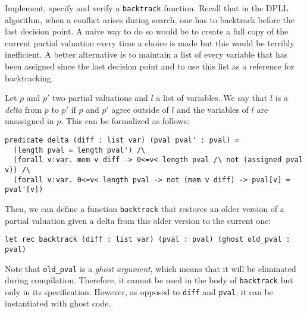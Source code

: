 \documentclass[11pt]{article}
\begin{document}
\begin{task}[5 pts] Implement, specify and verify a \texttt{backtrack} function. Recall that in the DPLL algorithm, when a conflict arises during search, one has to
backtrack before the last decision point. A naive way to do so would be to create a
full copy of the current partial valuation every time a choice is made but this
would be terribly inefficient. A better alternative is to maintain a list of every
variable that has been assigned since the last decision point and to use this list as a reference for backtracking.

Let $p$ and $p'$ two partial valuations and $l$ a list of variables. We say that
$l$ is a \emph{delta} from $p$ to $p'$ if $p$ and $p'$ agree outside of $l$ and
the variables of $l$ are unassigned in $p$. This can be formalized as follows:

\begin{lstlisting}
predicate delta (diff : list var) (pval pval' : pval) =
  (length pval = length pval') /\
  (forall v:var. mem v diff -> 0<=v< length pval /\ not (assigned pval v)) /\
  (forall v:var. 0<=v< length pval -> not (mem v diff) -> pval[v] = pval'[v])
\end{lstlisting}

Then, we can define a function \verb|backtrack| that restores an older version
of a partial valuation given a delta from this older version to the current one:

\begin{lstlisting}
let rec backtrack (diff : list var) (pval : pval) (ghost old_pval : pval)
\end{lstlisting}

Note that \verb|old_pval| is a \emph{ghost argument}, which means that it will be
eliminated during compilation. Therefore, it cannot be used in the body of \texttt{backtrack} but only in its specification. However, as opposed to 
\verb|diff| and \verb|pval|, it can be instantiated with ghost code. 

\end{task}
\end{document}
